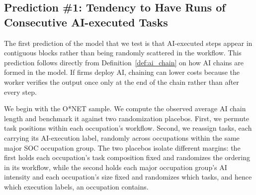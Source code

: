 \subsection{Prediction \#1: Tendency to Have Runs of Consecutive AI-executed Tasks}
\label{sec:chainLength_prediction}

The first prediction of the model that we test is that AI-executed steps appear in contiguous blocks rather than being randomly scattered in the workflow.
This prediction follows directly from Definition~\ref{def:ai_chain} on how AI chains are formed in the model.
If firms deploy AI, chaining can lower costs because the worker verifies the output once only at the end of the chain rather than after every step.

We begin with the O*NET sample.
We compute the observed average AI chain length and benchmark it against two randomization placebos.
First, we permute task positions within each occupation's workflow.
Second, we reassign tasks, each carrying its AI-execution label, randomly across occupations within the same major SOC occupation group.
The two placebos isolate different margins: the first holds each occupation's task composition fixed and randomizes the ordering in its workflow, while the second holds each major occupation group's AI intensity and each occupation's size fixed and randomizes which tasks, and hence which execution labels, an occupation contains.


